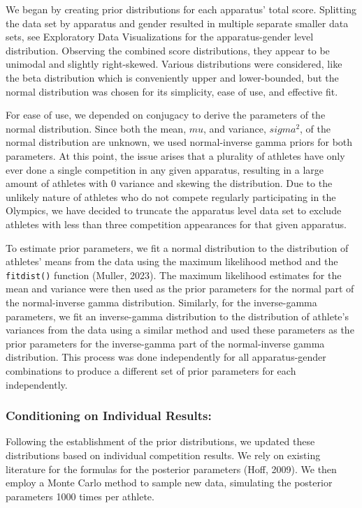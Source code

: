 \documentclass[
  letterpaper,
  DIV=11,
  numbers=noendperiod]{scrartcl}
\begin{document}
We began by creating prior distributions for each apparatus' total
score. Splitting the data set by apparatus and gender resulted in
multiple separate smaller data sets, see Exploratory Data Visualizations
for the apparatus-gender level distribution. Observing the combined
score distributions, they appear to be unimodal and slightly
right-skewed. Various distributions were considered, like the beta
distribution which is conveniently upper and lower-bounded, but the
normal distribution was chosen for its simplicity, ease of use, and
effective fit.

For ease of use, we depended on conjugacy to derive the parameters of
the normal distribution. Since both the mean, \(mu\), and variance,
\(sigma^2\), of the normal distribution are unknown, we used
normal-inverse gamma priors for both parameters. At this point, the
issue arises that a plurality of athletes have only ever done a single
competition in any given apparatus, resulting in a large amount of
athletes with 0 variance and skewing the distribution. Due to the
unlikely nature of athletes who do not compete regularly participating
in the Olympics, we have decided to truncate the apparatus level data
set to exclude athletes with less than three competition appearances for
that given apparatus.

To estimate prior parameters, we fit a normal distribution to the
distribution of athletes' means from the data using the maximum
likelihood method and the \texttt{fitdist()} function (Muller, 2023).
The maximum likelihood estimates for the mean and variance were then
used as the prior parameters for the normal part of the normal-inverse
gamma distribution. Similarly, for the inverse-gamma parameters, we fit
an inverse-gamma distribution to the distribution of athlete's variances
from the data using a similar method and used these parameters as the
prior parameters for the inverse-gamma part of the normal-inverse gamma
distribution. This process was done independently for all
apparatus-gender combinations to produce a different set of prior
parameters for each independently.

\hypertarget{conditioning-on-individual-results}{%
\subsubsection{Conditioning on Individual
Results:}\label{conditioning-on-individual-results}}

Following the establishment of the prior distributions, we updated these
distributions based on individual competition results. We rely on
existing literature for the formulas for the posterior parameters (Hoff,
2009). We then employ a Monte Carlo method to sample new data,
simulating the posterior parameters 1000 times per athlete.
\end{document}
